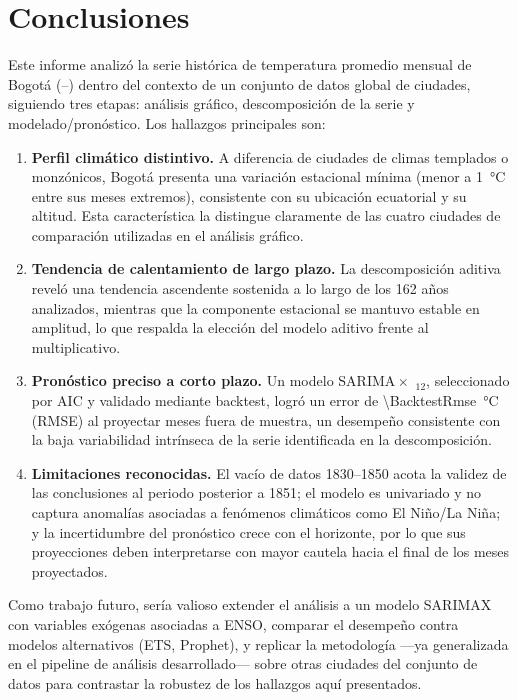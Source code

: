 \section{Conclusiones}
\label{sec:conclusiones}

Este informe analizó la serie histórica de temperatura promedio mensual de Bogotá
(\AnalysisStartYear{}--\AnalysisEndYear{}) dentro del contexto de un conjunto de datos
global de \DatasetCityCount{} ciudades, siguiendo tres etapas: análisis gráfico,
descomposición de la serie y modelado/pronóstico. Los hallazgos principales son:

\begin{enumerate}
  \item \textbf{Perfil climático distintivo.} A diferencia de ciudades de climas templados o
    monzónicos, Bogotá presenta una variación estacional mínima (menor a \SI{1}{\celsius}
    entre sus meses extremos), consistente con su ubicación ecuatorial y su altitud. Esta
    característica la distingue claramente de las cuatro ciudades de comparación utilizadas
    en el análisis gráfico.
  \item \textbf{Tendencia de calentamiento de largo plazo.} La descomposición aditiva reveló
    una tendencia ascendente sostenida a lo largo de los 162 años analizados, mientras que la
    componente estacional se mantuvo estable en amplitud, lo que respalda la elección del
    modelo aditivo frente al multiplicativo.
  \item \textbf{Pronóstico preciso a corto plazo.} Un modelo SARIMA\SarimaOrder{}\,$\times$\,
    \SarimaSeasonalOrder{}$_{12}$, seleccionado por AIC y validado mediante backtest, logró un
    error de \SI{\BacktestRmse}{\celsius} (RMSE) al proyectar \TestSizeMonths{} meses fuera de
    muestra, un desempeño consistente con la baja variabilidad intrínseca de la serie
    identificada en la descomposición.
  \item \textbf{Limitaciones reconocidas.} El vacío de datos 1830--1850 acota la validez de
    las conclusiones al periodo posterior a 1851; el modelo es univariado y no captura
    anomalías asociadas a fenómenos climáticos como El Niño/La Niña; y la incertidumbre del
    pronóstico crece con el horizonte, por lo que sus proyecciones deben interpretarse con
    mayor cautela hacia el final de los \FutureHorizonMonths{} meses proyectados.
\end{enumerate}

Como trabajo futuro, sería valioso extender el análisis a un modelo SARIMAX con variables
exógenas asociadas a ENSO, comparar el desempeño contra modelos alternativos (ETS, Prophet),
y replicar la metodología —ya generalizada en el pipeline de análisis desarrollado— sobre
otras ciudades del conjunto de datos para contrastar la robustez de los hallazgos aquí
presentados.
